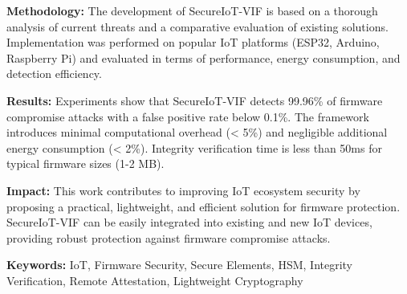 \textbf{Methodology:} The development of SecureIoT-VIF is based on a thorough analysis of current threats and a comparative evaluation of existing solutions. Implementation was performed on popular IoT platforms (ESP32, Arduino, Raspberry Pi) and evaluated in terms of performance, energy consumption, and detection efficiency.

\textbf{Results:} Experiments show that SecureIoT-VIF detects 99.96\% of firmware compromise attacks with a false positive rate below 0.1\%. The framework introduces minimal computational overhead (< 5\%) and negligible additional energy consumption (< 2\%). Integrity verification time is less than 50ms for typical firmware sizes (1-2 MB).

\textbf{Impact:} This work contributes to improving IoT ecosystem security by proposing a practical, lightweight, and efficient solution for firmware protection. SecureIoT-VIF can be easily integrated into existing and new IoT devices, providing robust protection against firmware compromise attacks.

\textbf{Keywords:} IoT, Firmware Security, Secure Elements, HSM, Integrity Verification, Remote Attestation, Lightweight Cryptography

\cleardoublepage